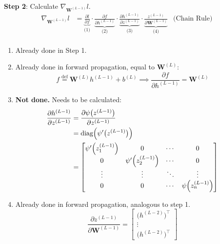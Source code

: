 \newpage

\textbf{Step 2}: Calculate $\nabla_{\textbf{W}^{(L-1)}}l$.
\begin{align*}
    \nabla_{\textbf{W}^{(L-1)}}l    &= \underbrace{\frac{\partial l}{\partial f}}_{\text{(1)}}\cdot\underbrace{\frac{\partial f}{\partial h^{(L-1)}}}_{\text{(2)}}\cdot\underbrace{\frac{\partial h^{(L-1)}}{\partial z^{(L-1)}}}_\text{(3)}\cdot\underbrace{\frac{z^{(L-1)}}{\partial \textbf{W}^{(L-1)}}}_\text{(4)}      & \text{(Chain Rule)} \\
\end{align*}
\begin{enumerate}
    \item Already done in Step 1.
    \item Already done in forward propagation, equal to $\textbf{W}^{(L)}$:
    $$
        f \overset{\text{def}}{=} \textbf{W}^{(L)}h^{(L-1)}+b^{(L)} \implies \frac{\partial f}{\partial h^{(L-1)}} = \textbf{W}^{(L)}
    $$
    \item \textbf{Not done.} Needs to be calculated:
    \begin{align*}
        \frac{\partial h^{(L-1)}}{\partial z^{(L-1)}}   &= \frac{\partial \psi\bigl( z^{(L-1)} \bigr)}{\partial z^{(L-1)}}  \\
                                                        &= \text{diag}\Bigl( \psi'\bigl( z^{(L-1)} \bigr) \Bigr)            \\
                                                        &= \begin{bmatrix}
                                                            \psi'\Bigl(z_1^{(L-1)}\Bigr) & 0 & \cdots & 0 \\
                                                            0 & \psi'\Bigl(z_2^{(L-1)}\Bigr) & \cdots & 0 \\
                                                            \vdots & \vdots & \ddots & \vdots             \\
                                                            0 & 0 & \cdots & \psi\Bigl(z_n^{(L-1)}\Bigr)  \\
                                                        \end{bmatrix}  
    \end{align*}
    \item Already done in forward propagation, analogous to step 1. 
    $$
        \frac{\partial z^{(L-1)}}{\partial \textbf{W}^{(L-1)}} =
        \begin{bmatrix}
            \bigl( h^{(L-2)} \bigr)^\top    \\
            \vdots                          \\
            \bigl( h^{(L-2)} \bigr)^\top
        \end{bmatrix}
    $$
\end{enumerate}

